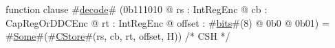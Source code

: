 function clause #\hyperref[sailMIPSzdecode]{decode}# (0b111010 @ rs : IntRegEnc @ cb : CapRegOrDDCEnc @ rt : IntRegEnc @ offset : #\hyperref[sailMIPSzbits]{bits}#(8) @ 0b0 @ 0b01) = #\hyperref[sailMIPSzSome]{Some}#(#\hyperref[sailMIPSzCStore]{CStore}#(rs, cb, rt, offset, H)) /* CSH */
